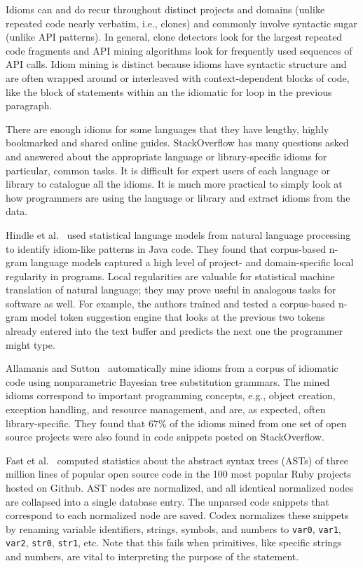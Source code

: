 Idioms can and do recur throughout distinct projects and domains (unlike repeated code nearly verbatim, i.e., clones) and commonly involve syntactic sugar (unlike API patterns). In general, clone detectors look for the largest repeated code fragments and API mining algorithms look for frequently used sequences of API calls. Idiom mining is distinct because idioms have syntactic structure and are often wrapped around or interleaved with context-dependent blocks of code, like the block of statements within an the idiomatic for loop in the previous paragraph.

There are enough idioms for some languages that they have lengthy, highly bookmarked and shared online guides. StackOverflow has many questions asked and answered about the appropriate language or library-specific idioms for particular, common tasks. It is difficult for expert users of each language or library to catalogue all the idioms. It is much more practical to simply look at how programmers are using the language or library and extract idioms from the data.

Hindle et al.~\cite{Hindle2012} used statistical language models from natural language processing to identify idiom-like patterns in Java code. They found that corpus-based n-gram language models captured a high level of project- and domain-specific local regularity in programs. Local regularities are valuable for statistical machine translation of natural language; they may prove useful in analogous tasks for software as well. For example, the authors trained and tested a corpus-based n-gram model token suggestion engine that looks at the previous two tokens already entered into the text buffer and predicts the next one the programmer might type.

Allamanis and Sutton~\cite{allamanis2014mining} automatically mine idioms from a corpus of idiomatic code using nonparametric Bayesian tree substitution grammars. The mined idioms correspond to important programming concepts, e.g., object creation, exception handling, and resource management, and are, as expected, often library-specific. They found that 67\% of the idioms mined from one set of open source projects were also found in code snippets posted on StackOverflow.

Fast et al.~\cite{codex} computed statistics about the abstract syntax trees (ASTs) of three million lines of popular open source code in the 100 most popular Ruby projects hosted on Github. AST nodes are normalized, and all identical normalized nodes are collapsed into a single database entry. The unparsed code snippets that correspond to each normalized node are saved. Codex normalizes these snippets by renaming variable identifiers, strings, symbols, and numbers to \texttt{var0}, \texttt{var1}, \texttt{var2}, \texttt{str0}, \texttt{str1}, etc. Note that this fails when primitives, like specific strings and numbers, are vital to interpreting the purpose of the statement.

